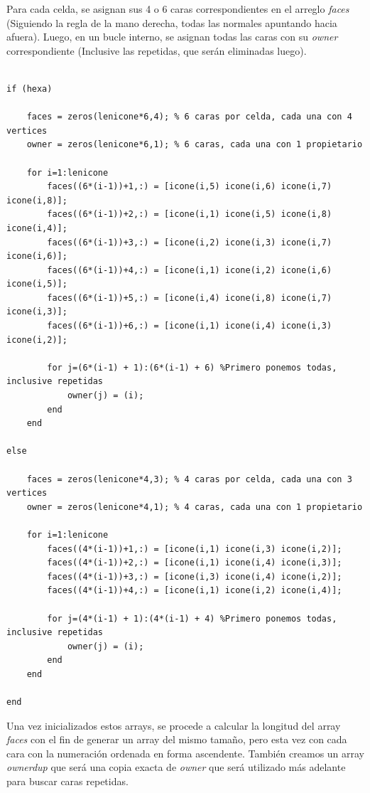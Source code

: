 \documentclass[11pt]{article}
\begin{document}
\bigskip Para cada celda, se asignan sus 4 o 6 caras correspondientes en el arreglo \textit{faces} (Siguiendo la regla de la mano derecha, todas las normales apuntando hacia afuera). Luego, en un bucle interno, se asignan todas las caras con su \textit{owner} correspondiente (Inclusive las repetidas, que ser\'an eliminadas luego).  

\bigskip
\lstset{language=Matlab, breaklines=true, basicstyle=\footnotesize}
\begin{lstlisting}[frame=single]
%% Calculo de faces y owner

if (hexa)

    faces = zeros(lenicone*6,4); % 6 caras por celda, cada una con 4 vertices
    owner = zeros(lenicone*6,1); % 6 caras, cada una con 1 propietario

    for i=1:lenicone
        faces((6*(i-1))+1,:) = [icone(i,5) icone(i,6) icone(i,7) icone(i,8)];
        faces((6*(i-1))+2,:) = [icone(i,1) icone(i,5) icone(i,8) icone(i,4)];
        faces((6*(i-1))+3,:) = [icone(i,2) icone(i,3) icone(i,7) icone(i,6)];
        faces((6*(i-1))+4,:) = [icone(i,1) icone(i,2) icone(i,6) icone(i,5)];
        faces((6*(i-1))+5,:) = [icone(i,4) icone(i,8) icone(i,7) icone(i,3)];
        faces((6*(i-1))+6,:) = [icone(i,1) icone(i,4) icone(i,3) icone(i,2)];

        for j=(6*(i-1) + 1):(6*(i-1) + 6) %Primero ponemos todas, inclusive repetidas
            owner(j) = (i);
        end
    end
    
else
    
    faces = zeros(lenicone*4,3); % 4 caras por celda, cada una con 3 vertices
    owner = zeros(lenicone*4,1); % 4 caras, cada una con 1 propietario

    for i=1:lenicone
        faces((4*(i-1))+1,:) = [icone(i,1) icone(i,3) icone(i,2)];
        faces((4*(i-1))+2,:) = [icone(i,1) icone(i,4) icone(i,3)];
        faces((4*(i-1))+3,:) = [icone(i,3) icone(i,4) icone(i,2)];
        faces((4*(i-1))+4,:) = [icone(i,1) icone(i,2) icone(i,4)];

        for j=(4*(i-1) + 1):(4*(i-1) + 4) %Primero ponemos todas, inclusive repetidas
            owner(j) = (i);
        end
    end
    
end
\end{lstlisting}
\bigskip

\bigskip Una vez inicializados estos arrays, se procede a calcular la longitud del array \textit{faces} con el fin de generar un array del mismo tama\~no, pero esta vez con cada cara con la numeraci\'on ordenada en forma ascendente. Tambi\'en creamos un array \textit{ownerdup} que ser\'a una copia exacta de \textit{owner} que ser\'a utilizado m\'as adelante para buscar caras repetidas.
\end{document}
